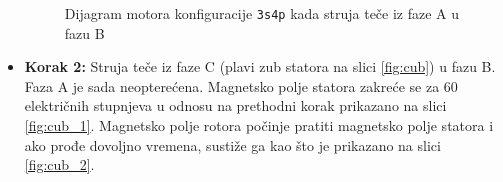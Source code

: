 \documentclass[diplomskirad]{fer}
\begin{document}
\begin{itemize}
\begin{figure}[h!]
		      \caption{Dijagram motora konfiguracije \texttt{3s4p} kada struja teče iz faze A u fazu B}
		      \label{fig:aub}
	      \end{figure}

	\item \textbf{Korak 2:} Struja teče iz faze C (plavi zub statora na slici \ref{fig:cub}) u fazu B. Faza A je sada neopterećena. Magnetsko polje statora zakreće se za 60 električnih stupnjeva u odnosu na prethodni korak prikazano na slici \ref{fig:cub_1}. Magnetsko polje rotora počinje pratiti magnetsko polje statora i ako prođe dovoljno vremena, sustiže ga kao što je prikazano na slici \ref{fig:cub_2}.
	      \begin{figure}[h!]
		      \centering


\end{figure}
\end{itemize}
\end{document}
